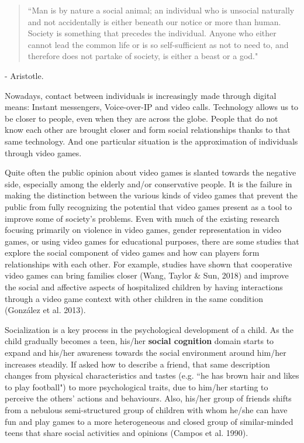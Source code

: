 \documentclass[runningheads]{llncs}
\begin{document}
\begin{quotation}
``Man is by nature a social animal; an individual who is unsocial naturally and not accidentally is either beneath our notice or more than human. Society is something that precedes the individual. Anyone who either cannot lead the common life or is so self-sufficient as not to need to, and therefore does not partake of society, is either a beast or a god."
\end{quotation}
\par - Aristotle.
\bigskip
\par Nowadays, contact between individuals is increasingly made through digital means: Instant messengers, Voice-over-IP and video calls. Technology allows us to be closer to people, even when they are across the globe. People that do not know each other are brought closer and form social relationships thanks to that same technology. And one particular situation is the approximation of individuals through video games.
\par Quite often the public opinion about video games is slanted towards the negative side, especially among the elderly and/or conservative people. It is the failure in making the distinction between the various kinds of video games that prevent the public from fully recognizing the potential that video games present as a tool to improve some of society's problems. Even with much of the existing research focusing primarily on violence in video games, gender representation in video games, or using video games for educational purposes, there are some studies that explore the social component of video games and how can players form relationships with each other. For example, studies have shown that cooperative video games can bring families closer (Wang, Taylor \& Sun, 2018) and improve the social and affective aspects of hospitalized children by having interactions through a video game context with other children in the same condition (González et al. 2013). 
\par Socialization is a key process in the psychological development of a child. As the child gradually becomes a teen, his/her \textbf{social cognition} domain starts to expand and his/her awareness towards the social environment around him/her increases steadily. If asked how to describe a friend, that same description changes from physical characteristics and tastes (e.g. ``he has brown hair and likes to play football") to more psychological traits, due to him/her starting to perceive the others' actions and behaviours. Also, his/her group of friends shifts from a nebulous semi-structured group of children with whom he/she can have fun and play games to a more heterogeneous and closed group of similar-minded teens that share social activities and opinions (Campos et al. 1990). 
\end{document}
